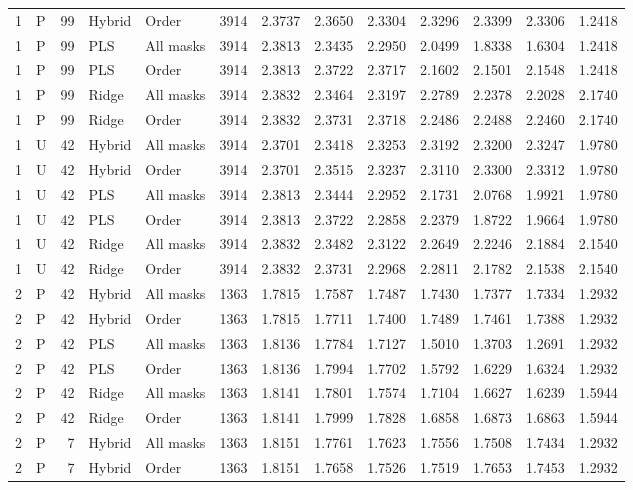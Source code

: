 \documentclass[10pt,a4paper]{article}
\begin{document}
\begin{longtable}{rlrllrrrrrrrr}
1 & P & 99 & Hybrid & Order & 3914 & 2.3737 & 2.3650 & 2.3304 & 2.3296 & 2.3399 & 2.3306 & 1.2418 \\
1 & P & 99 & PLS & All masks & 3914 & 2.3813 & 2.3435 & 2.2950 & 2.0499 & 1.8338 & 1.6304 & 1.2418 \\
1 & P & 99 & PLS & Order & 3914 & 2.3813 & 2.3722 & 2.3717 & 2.1602 & 2.1501 & 2.1548 & 1.2418 \\
1 & P & 99 & Ridge & All masks & 3914 & 2.3832 & 2.3464 & 2.3197 & 2.2789 & 2.2378 & 2.2028 & 2.1740 \\
1 & P & 99 & Ridge & Order & 3914 & 2.3832 & 2.3731 & 2.3718 & 2.2486 & 2.2488 & 2.2460 & 2.1740 \\
1 & U & 42 & Hybrid & All masks & 3914 & 2.3701 & 2.3418 & 2.3253 & 2.3192 & 2.3200 & 2.3247 & 1.9780 \\
1 & U & 42 & Hybrid & Order & 3914 & 2.3701 & 2.3515 & 2.3237 & 2.3110 & 2.3300 & 2.3312 & 1.9780 \\
1 & U & 42 & PLS & All masks & 3914 & 2.3813 & 2.3444 & 2.2952 & 2.1731 & 2.0768 & 1.9921 & 1.9780 \\
1 & U & 42 & PLS & Order & 3914 & 2.3813 & 2.3722 & 2.2858 & 2.2379 & 1.8722 & 1.9664 & 1.9780 \\
1 & U & 42 & Ridge & All masks & 3914 & 2.3832 & 2.3482 & 2.3122 & 2.2649 & 2.2246 & 2.1884 & 2.1540 \\
1 & U & 42 & Ridge & Order & 3914 & 2.3832 & 2.3731 & 2.2968 & 2.2811 & 2.1782 & 2.1538 & 2.1540 \\
2 & P & 42 & Hybrid & All masks & 1363 & 1.7815 & 1.7587 & 1.7487 & 1.7430 & 1.7377 & 1.7334 & 1.2932 \\
2 & P & 42 & Hybrid & Order & 1363 & 1.7815 & 1.7711 & 1.7400 & 1.7489 & 1.7461 & 1.7388 & 1.2932 \\
2 & P & 42 & PLS & All masks & 1363 & 1.8136 & 1.7784 & 1.7127 & 1.5010 & 1.3703 & 1.2691 & 1.2932 \\
2 & P & 42 & PLS & Order & 1363 & 1.8136 & 1.7994 & 1.7702 & 1.5792 & 1.6229 & 1.6324 & 1.2932 \\
2 & P & 42 & Ridge & All masks & 1363 & 1.8141 & 1.7801 & 1.7574 & 1.7104 & 1.6627 & 1.6239 & 1.5944 \\
2 & P & 42 & Ridge & Order & 1363 & 1.8141 & 1.7999 & 1.7828 & 1.6858 & 1.6873 & 1.6863 & 1.5944 \\
2 & P & 7 & Hybrid & All masks & 1363 & 1.8151 & 1.7761 & 1.7623 & 1.7556 & 1.7508 & 1.7434 & 1.2932 \\
2 & P & 7 & Hybrid & Order & 1363 & 1.8151 & 1.7658 & 1.7526 & 1.7519 & 1.7653 & 1.7453 & 1.2932 \\

\end{longtable}
\end{document}
